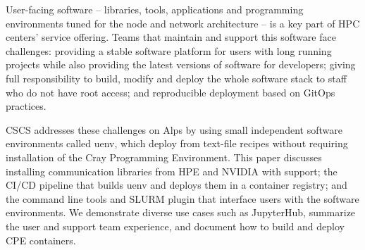 User-facing software -- libraries, tools, applications and programming environments tuned for the node and network architecture -- is a key part of HPC centers' service offering.
Teams that maintain and support this software face challenges: providing a stable software platform for users with long running projects while also providing the latest versions of software for developers; giving full responsibility to build, modify and deploy the whole software stack to staff who do not have root access; and reproducible deployment based on GitOps practices.

CSCS addresses these challenges on Alps by using small independent software environments called uenv, which deploy from text-file recipes without requiring installation of the Cray Programming Environment.
This paper discusses installing communication libraries from HPE and NVIDIA with \slingshot support; the CI/CD pipeline that builds uenv and deploys them in a container registry; and the command line tools and SLURM plugin that interface users with the software environments.
We demonstrate diverse use cases such as JupyterHub, summarize the user and support team experience, and document how to build and deploy CPE containers.

